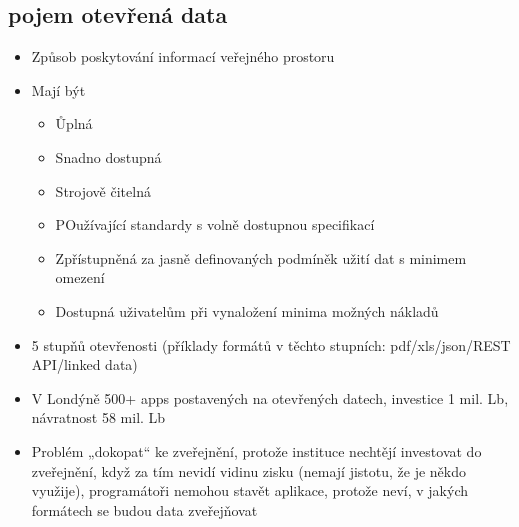 \subsection{pojem otevřená data}
\begin{itemize}
    \item Způsob poskytování informací veřejného prostoru
    \item Mají být
    \begin{itemize}
        \item Ůplná
        \item Snadno dostupná
        \item Strojově čitelná
        \item POužívající standardy s volně dostupnou specifikací
        \item Zpřístupněná za jasně definovaných podmíněk užití dat s minimem omezení
        \item Dostupná uživatelům při vynaložení minima možných nákladů
    \end{itemize}
    \item 5 stupňů otevřenosti (příklady formátů v těchto stupních: pdf/xls/json/REST API/linked data)
    \item V Londýně 500+ apps postavených na otevřených datech, investice 1 mil. Lb, návratnost 58
mil. Lb
\item Problém „dokopat“ ke zveřejnění, protože instituce nechtějí investovat do zveřejnění, když za
tím nevidí vidinu zisku (nemají jistotu, že je někdo využije), programátoři nemohou stavět
aplikace, protože neví, v jakých formátech se budou data zveřejňovat


\end{itemize}
